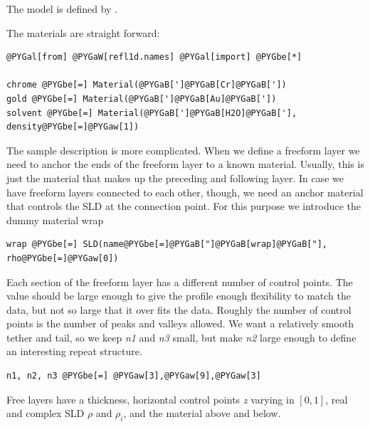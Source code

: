 \documentclass[letterpaper,10pt,english]{sphinxmanual}
\begin{document}
The model is defined by .

The materials are straight forward:

\begin{Verbatim}[commandchars=@\[\]]
@PYGal[from] @PYGaW[refl1d.names] @PYGal[import] @PYGbe[*]

chrome @PYGbe[=] Material(@PYGaB[']@PYGaB[Cr]@PYGaB['])
gold @PYGbe[=] Material(@PYGaB[']@PYGaB[Au]@PYGaB['])
solvent @PYGbe[=] Material(@PYGaB[']@PYGaB[H2O]@PYGaB['], density@PYGbe[=]@PYGaw[1])
\end{Verbatim}

The sample description is more complicated.  When we define a freeform
layer we need to anchor the ends of the freeform layer to a known
material.  Usually, this is just the material that makes up the preceding
and following layer.  In case we have freeform layers connected to each
other, though, we need an anchor material that controls the SLD at the
connection point.  For this purpose we introduce the dummy material
wrap

\begin{Verbatim}[commandchars=@\[\]]
wrap @PYGbe[=] SLD(name@PYGbe[=]@PYGaB["]@PYGaB[wrap]@PYGaB["], rho@PYGbe[=]@PYGaw[0])
\end{Verbatim}

Each section of the freeform layer has a different number of control
points.  The value should be large enough to give the profile enough
flexibility to match the data, but not so large that it over fits the
data.  Roughly the number of control points is the number of peaks and
valleys allowed.  We want a relatively smooth tether and tail, so we
keep \emph{n1} and \emph{n3} small, but make \emph{n2} large enough to define an
interesting repeat structure.

\begin{Verbatim}[commandchars=@\[\]]
n1, n2, n3 @PYGbe[=] @PYGaw[3],@PYGaw[9],@PYGaw[3]
\end{Verbatim}

Free layers have a thickness, horizontal control points \emph{z} varying
in $[0,1]$, real and complex SLD $\rho$ and $\rho_i$, and the material
above and below.
\end{document}
